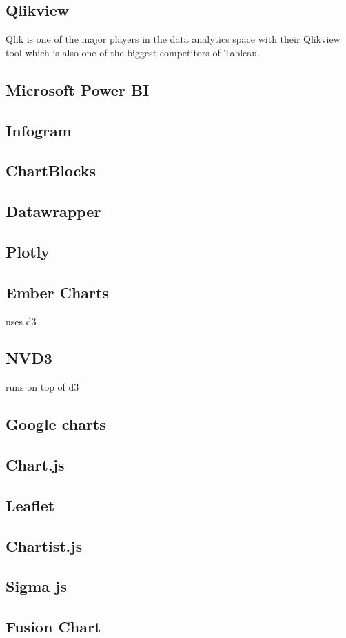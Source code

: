 \subsection{Qlikview}
Qlik is one of the major players in the data analytics space with their Qlikview tool which is also one of the biggest competitors of Tableau.


\subsection{Microsoft Power BI}





\subsection{Infogram}
\subsection{ChartBlocks}
\subsection{Datawrapper}
\subsection{Plotly}

\subsection{Ember Charts}
uses d3

\subsection{NVD3}
runs on top of d3
\subsection{Google charts}
\subsection{Chart.js}
\subsection{Leaflet}
\subsection{Chartist.js}
\subsection{Sigma js}
\subsection{Fusion Chart}

